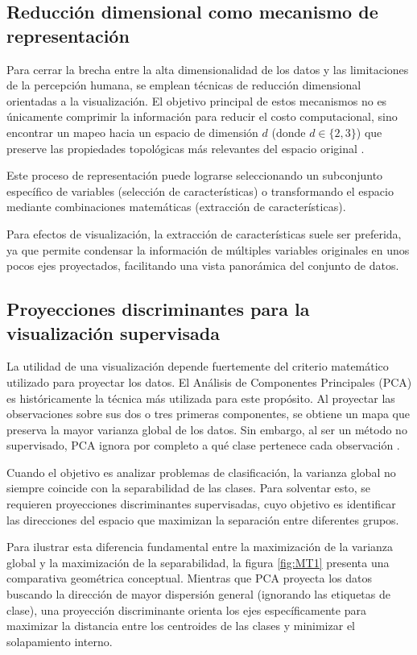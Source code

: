 \subsection{Reducción dimensional como mecanismo de representación}

Para cerrar la brecha entre la alta dimensionalidad de los datos y las limitaciones de la percepción humana, se emplean técnicas de reducción dimensional orientadas a la visualización. El objetivo principal de estos mecanismos no es únicamente comprimir la información para reducir el costo computacional, sino encontrar un mapeo hacia un espacio de dimensión $d$ (donde $d \in \{2, 3\}$) que preserve las propiedades topológicas más relevantes del espacio original \cite{PENDIENTE_ReduccionDimensionalVisualizacion}.

Este proceso de representación puede lograrse seleccionando un subconjunto específico de variables (selección de características) o transformando el espacio mediante combinaciones matemáticas (extracción de características). 

Para efectos de visualización, la extracción de características suele ser preferida, ya que permite condensar la información de múltiples variables originales en unos pocos ejes proyectados, facilitando una vista panorámica del conjunto de datos.

\subsection{Proyecciones discriminantes para la visualización supervisada}

La utilidad de una visualización depende fuertemente del criterio matemático utilizado para proyectar los datos. El Análisis de Componentes Principales (PCA) es históricamente la técnica más utilizada para este propósito. Al proyectar las observaciones sobre sus dos o tres primeras componentes, se obtiene un mapa que preserva la mayor varianza global de los datos. Sin embargo, al ser un método no supervisado, PCA ignora por completo a qué clase pertenece cada observación \cite{PENDIENTE_LimitacionesPCAVisualizacion}.

Cuando el objetivo es analizar problemas de clasificación, la varianza global no siempre coincide con la separabilidad de las clases. Para solventar esto, se requieren proyecciones discriminantes supervisadas, cuyo objetivo es identificar las direcciones del espacio que maximizan la separación entre diferentes grupos.

Para ilustrar esta diferencia fundamental entre la maximización de la varianza global y la maximización de la separabilidad, la figura \ref{fig:MT1} presenta una comparativa geométrica conceptual. Mientras que PCA proyecta los datos buscando la dirección de mayor dispersión general (ignorando las etiquetas de clase), una proyección discriminante orienta los ejes específicamente para maximizar la distancia entre los centroides de las clases y minimizar el solapamiento interno.

